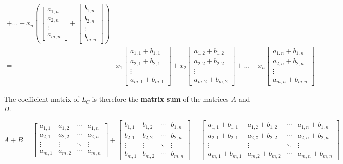 \documentclass{article}
\begin{document}
\begin{align*}
+ ... + x_n\left(\begin{bmatrix} a_{1,n} \\ a_{2,n} \\ \vdots \\ a_{m,n} \end{bmatrix} + \begin{bmatrix} b_{1,n} \\ b_{2,n} \\ \vdots \\ b_{m,n} \end{bmatrix}\right) \\ 
= & x_1\begin{bmatrix} a_{1,1} + b_{1,1} \\ a_{2,1} + b_{2,1} \\ \vdots \\ a_{m,1} + b_{m,1} \end{bmatrix}
+ x_2\begin{bmatrix} a_{1,2} + b_{1,2} \\ a_{2,2} + b_{2,2} \\ \vdots \\ a_{m,2} + b_{m,2} \end{bmatrix}
+ ... + x_n\begin{bmatrix} a_{1,n} + b_{1,n} \\ a_{2,n} + b_{2,n} \\ \vdots \\ a_{m,n} + b_{m,n} \end{bmatrix}
\end{align*}

The coefficient matrix of \(L_C\) is therefore the {\bf matrix sum} of the matrices \(A\) and \(B\): 

\[A + B = \begin{bmatrix} 
a_{1,1} & a_{1,2} & \cdots & a_{1,n} \\
a_{2,1} & a_{2,2} & \cdots & a_{2,n} \\
\vdots & \vdots & \ddots & \vdots \\
a_{m,1} & a_{m,2} & \cdots & a_{m,n} 
\end{bmatrix} + \begin{bmatrix} 
b_{1,1} & b_{1,2} & \cdots & b_{1,n} \\
b_{2,1} & b_{2,2} & \cdots & b_{2,n} \\
\vdots & \vdots & \ddots & \vdots \\
b_{m,1} & b_{m,2} & \cdots & b_{m,n} 
\end{bmatrix} = \begin{bmatrix} 
a_{1,1} + b_{1,1} & a_{1,2} + b_{1,2} & \cdots & a_{1,n} + b_{1,n} \\
a_{2,1} + b_{2,1} & a_{2,2} + b_{2,2} & \cdots & a_{2,n} + b_{2,n}\\
\vdots & \vdots & \ddots & \vdots \\
a_{m,1} + b_{m,1} & a_{m,2} + b_{m,2} & \cdots & a_{m,n} + b_{m,n}
\end{bmatrix}\]
\end{document}
